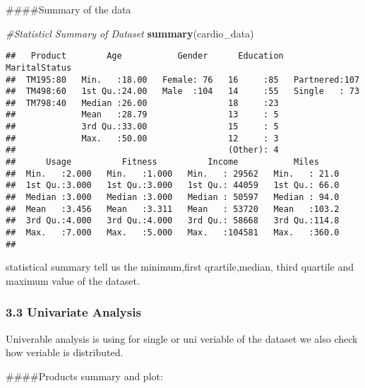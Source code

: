 \documentclass[
]{article}
\newenvironment{Shaded}{\begin{snugshade}}{\end{snugshade}}
\newcommand{\CommentTok}[1]{\textcolor[rgb]{0.56,0.35,0.01}{\textit{#1}}}
\newcommand{\KeywordTok}[1]{\textcolor[rgb]{0.13,0.29,0.53}{\textbf{#1}}}
\newcommand{\NormalTok}[1]{#1}
\newcommand{\OperatorTok}[1]{\textcolor[rgb]{0.81,0.36,0.00}{\textbf{#1}}}
\begin{document}
\#\#\#\#Summary of the data

\begin{Shaded}
\begin{Highlighting}[]
\CommentTok{#Statisticl Summary of Dataset}
\KeywordTok{summary}\NormalTok{(cardio_data)}
\end{Highlighting}
\end{Shaded}

\begin{verbatim}
##   Product        Age           Gender      Education    MaritalStatus
##  TM195:80   Min.   :18.00   Female: 76   16     :85   Partnered:107  
##  TM498:60   1st Qu.:24.00   Male  :104   14     :55   Single   : 73  
##  TM798:40   Median :26.00                18     :23                  
##             Mean   :28.79                13     : 5                  
##             3rd Qu.:33.00                15     : 5                  
##             Max.   :50.00                12     : 3                  
##                                          (Other): 4                  
##      Usage          Fitness          Income           Miles      
##  Min.   :2.000   Min.   :1.000   Min.   : 29562   Min.   : 21.0  
##  1st Qu.:3.000   1st Qu.:3.000   1st Qu.: 44059   1st Qu.: 66.0  
##  Median :3.000   Median :3.000   Median : 50597   Median : 94.0  
##  Mean   :3.456   Mean   :3.311   Mean   : 53720   Mean   :103.2  
##  3rd Qu.:4.000   3rd Qu.:4.000   3rd Qu.: 58668   3rd Qu.:114.8  
##  Max.   :7.000   Max.   :5.000   Max.   :104581   Max.   :360.0  
## 
\end{verbatim}

statistical summary tell us the minimum,first qrartile,median, third
quartile and maximum value of the dataset.

\hypertarget{univariate-analysis}{%
\subsubsection{3.3 Univariate Analysis}\label{univariate-analysis}}

Univerable analysis is using for single or uni veriable of the dataset
we also check how veriable is distributed.

\#\#\#\#Products summary and plot:

\begin{Shaded}
\end{Shaded}
\end{document}
